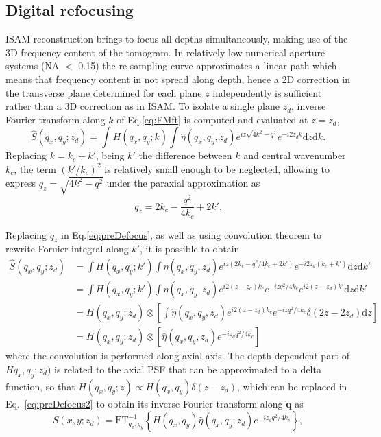 \subsection{Digital refocusing}

ISAM reconstruction brings to focus all depths simultaneously, making use of the 3D frequency content of the tomogram. In relatively low numerical aperture systems (NA $<$ 0.15) the re-sampling curve approximates a linear path which means that frequency content in not spread along depth, hence a 2D correction in the transverse plane determined for each plane $z$ independently is sufficient~\cite{Yasuno2006_Noniterative, South2016_Computed} rather than a 3D correction as in ISAM. To isolate a single plane $z_d$, inverse Fourier transform along $k$ of Eq.\eqref{eq:FMft} is computed and evaluated at $z=z_d$,
\begin{equation}\label{eq:preDefocus}
    \hat{S}(q_x,q_y; z_d) = \int H(q_x, q_y; k) \int \hat{\eta}(q_x,q_y, z_d) e^{iz\sqrt{4k^2-q^2}} e^{-i2z_dk} \text{d}z\text{d}k.
\end{equation}
Replacing $k=k_c + k'$, being $k'$ the difference between $k$ and central wavenumber $k_c$, the term $(k'/k_c)^2$ is relatively small enough to be neglected, allowing to express $q_z=\sqrt{4k^2-q^2}$ under the paraxial approximation as~\cite{South2016_Computed}
\begin{equation}\label{eq:qzAprox}
    q_z = 2k_c - \frac{q^2}{4k_c} + 2k'.
\end{equation}

Replacing $q_z$ in Eq.\eqref{eq:preDefocus}, as well as using convolution theorem to rewrite Foruier integral along $k'$, it is possible to obtain~\cite{South2016_Computed}
\begin{align}\label{eq:preDefocus2}
    \hat{S}(q_x,q_y; z_d) &= \int H(q_x, q_y; k') \int \hat{\eta}(q_x,q_y, z_d) e^{iz(2k_c - q^2/4k_c + 2k')} e^{-i2z_d(k_c+k')} \text{d}z\text{d}k' \nonumber \\
    &= \int H(q_x, q_y; k') \int \hat{\eta}(q_x,q_y, z_d) e^{i2(z-z_d)k_c} e^{-izq^2/4k_c} e^{i2(z-z_d)k'} \text{d}z\text{d}k' \nonumber \\
    &= H(q_x, q_y; z_d) \otimes \left[ \int \hat{\eta}(q_x,q_y, z_d) e^{i2(z-z_d)k_c} e^{-izq^2/4k_c}  \delta(2z-2z_d) \text{d}z\right] \nonumber \\
    &= H(q_x, q_y; z_d) \otimes \left[ \hat{\eta}(q_x,q_y, z_d) e^{-iz_dq^2/4k_c}  \right]
\end{align}
where the convolution is performed along axial axis. The depth-dependent part of $Hq_x,q_y;z_d)$ is related to the axial PSF that can be approximated to a delta function, so that $H(q_x, q_y; z) \propto H(q_x, q_y)\delta(z-z_d)$, which can be replaced in Eq.~\eqref{eq:preDefocus2} to obtain its inverse Fourier transform along $\mathbf{q}$ as
\begin{equation}\label{eq:defocus}
    S(x, y; z_d) = \text{FT}^{-1}_{q_x, q_y}\left\{H(q_x, q_y)\hat{\eta}(q_x, q_y; z_d) e^{-iz_dq^2/4k_c}\right\},
\end{equation}

